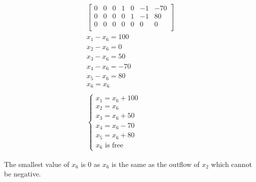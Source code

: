 \documentclass[12pt letter openany]{report}
\begin{document}
\begin{align*}
\begin{bmatrix}
    0 & 0 & 0 & 1 & 0 & -1 & -70 \\
    0 & 0 & 0 & 0 & 1 & -1 & 80  \\
    0 & 0 & 0 & 0 & 0 & 0  & 0   \\
  \end{bmatrix}
  \\
  x_1 - x_6 = 100                 \\
  x_2 - x_6 = 0                   \\
  x_3 - x_6 = 50                  \\
  x_4 - x_6 = -70                 \\
  x_5 - x_6 = 80                  \\
  x_6 = x_6                       \\
  \\
  \begin{cases}
    x_1 = x_6 + 100 \\
    x_2 = x_6       \\
    x_3 = x_6 + 50  \\
    x_4 = x_6 - 70  \\
    x_5 = x_6 + 80  \\
    x_6 \text{ is free}
  \end{cases}
\end{align*}

The smallest value of $x_6$ is 0 as $x_6$ is the same as the outflow of $x_2$  which cannot be negative.

\end{document}
